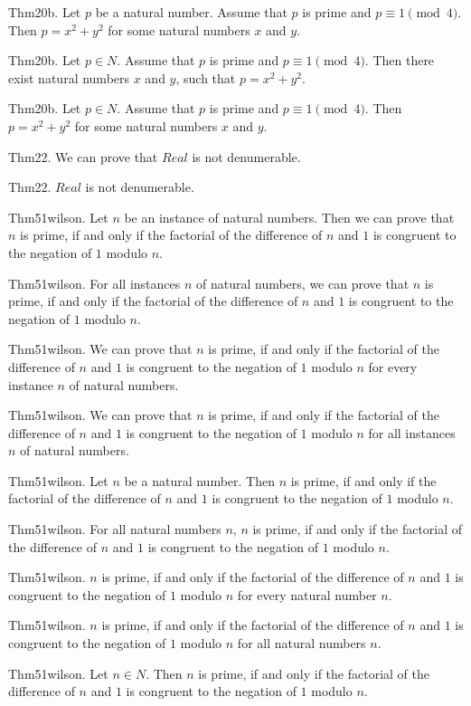 \documentclass{article}
\begin{document}
Thm20b. Let $p$ be a natural number. Assume that $p$ is prime and $p \equiv 1 \pmod{ 4}$. Then $p = x ^{ 2}+ y ^{ 2}$ for some natural numbers $x$ and $y$.

Thm20b. Let $p \in N$. Assume that $p$ is prime and $p \equiv 1 \pmod{ 4}$. Then there exist natural numbers $x$ and $y$, such that $p = x ^{ 2}+ y ^{ 2}$.

Thm20b. Let $p \in N$. Assume that $p$ is prime and $p \equiv 1 \pmod{ 4}$. Then $p = x ^{ 2}+ y ^{ 2}$ for some natural numbers $x$ and $y$.

Thm22. We can prove that $Real$ is not denumerable.

Thm22. $Real$ is not denumerable.

Thm51wilson. Let $n$ be an instance of natural numbers. Then we can prove that $n$ is prime, if and only if the factorial of the difference of $n$ and $1$ is congruent to the negation of $1$ modulo $n$.

Thm51wilson. For all instances $n$ of natural numbers, we can prove that $n$ is prime, if and only if the factorial of the difference of $n$ and $1$ is congruent to the negation of $1$ modulo $n$.

Thm51wilson. We can prove that $n$ is prime, if and only if the factorial of the difference of $n$ and $1$ is congruent to the negation of $1$ modulo $n$ for every instance $n$ of natural numbers.

Thm51wilson. We can prove that $n$ is prime, if and only if the factorial of the difference of $n$ and $1$ is congruent to the negation of $1$ modulo $n$ for all instances $n$ of natural numbers.

Thm51wilson. Let $n$ be a natural number. Then $n$ is prime, if and only if the factorial of the difference of $n$ and $1$ is congruent to the negation of $1$ modulo $n$.

Thm51wilson. For all natural numbers $n$, $n$ is prime, if and only if the factorial of the difference of $n$ and $1$ is congruent to the negation of $1$ modulo $n$.

Thm51wilson. $n$ is prime, if and only if the factorial of the difference of $n$ and $1$ is congruent to the negation of $1$ modulo $n$ for every natural number $n$.

Thm51wilson. $n$ is prime, if and only if the factorial of the difference of $n$ and $1$ is congruent to the negation of $1$ modulo $n$ for all natural numbers $n$.

Thm51wilson. Let $n \in N$. Then $n$ is prime, if and only if the factorial of the difference of $n$ and $1$ is congruent to the negation of $1$ modulo $n$.
\end{document}

